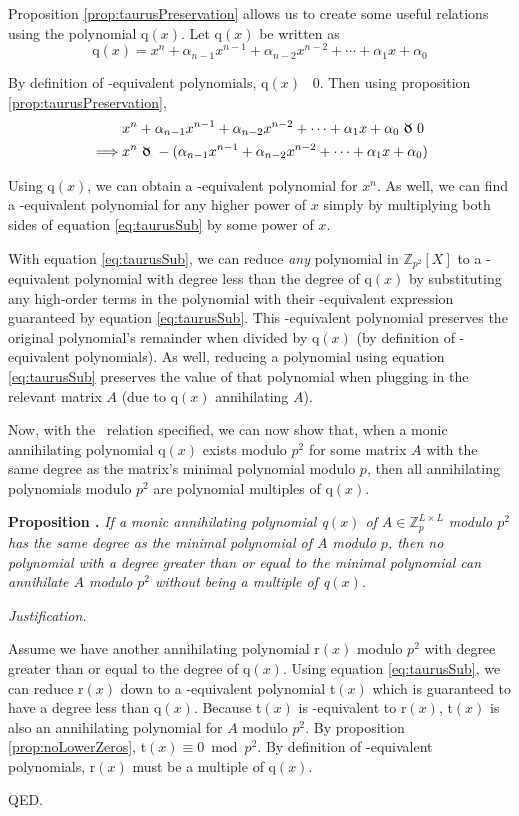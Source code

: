 \documentclass[a4paper, 12pt, reqno]{amsart}
\newcounter{propcounter}
\newenvironment{proposition}[1]
{
	\vspace{1em}
	\refstepcounter{propcounter} %
	\textbf{Proposition \thepropcounter.} \emph{#1}
	
	\emph{Justification.}
}
{
	QED. \\
}
\begin{document}
		Proposition \ref{prop:taurusPreservation} allows us to create some useful relations using the polynomial q$(x)$. Let q$(x)$ be written as
		\[
			\text{q}(x) = x^n + \alpha_{n-1}x^{n-1} + \alpha_{n-2}x^{n-2} + \cdots + \alpha_1x + \alpha_0
		\]
		
		By definition of \Taurus-equivalent polynomials, q$(x)$ \Taurus\ 0. Then using proposition \ref{prop:taurusPreservation},
		\begin{align}
			         & x^n + \alpha_{n-1}x^{n-1} + \alpha_{n-2}x^{n-2} + \cdots + \alpha_1x + \alpha_0 \ \text{\Taurus}\ 0 \nonumber \\
			\implies & x^n \ \text{\Taurus}\ -(\alpha_{n-1}x^{n-1} + \alpha_{n-2}x^{n-2} + \cdots + \alpha_1x + \alpha_0)
			\label{eq:taurusSub}
		\end{align}
		
		Using q$(x)$, we can obtain a \Taurus-equivalent polynomial for $x^n$. As well, we can find a \Taurus-equivalent polynomial for any higher power of $x$ simply by 
		multiplying both sides of equation \ref{eq:taurusSub} by some power of $x$.
		
		With equation \ref{eq:taurusSub}, we can reduce \emph{any} polynomial in $\mathds{Z}_{p^2}[X]$ to a \Taurus-equivalent polynomial with degree less than the 
		degree of q$(x)$ by substituting any high-order terms in the polynomial with their \Taurus-equivalent expression guaranteed by equation \ref{eq:taurusSub}. This 
		\Taurus-equivalent polynomial preserves the original polynomial's remainder when divided by q$(x)$ (by definition of \Taurus-equivalent polynomials). As well, 
		reducing a polynomial using equation \ref{eq:taurusSub} preserves the value of that polynomial when plugging in the relevant matrix $A$ (due to q$(x)$ annihilating 
		$A$).
		
		Now, with the \Taurus\ relation specified, we can now show that, when a monic annihilating polynomial q$(x)$ exists modulo $p^2$ for some matrix $A$ with the same 
		degree as the matrix's minimal polynomial modulo $p$, then all annihilating polynomials modulo $p^2$ are polynomial multiples of q$(x)$.

		\begin{proposition}{If a monic annihilating polynomial q$(x)$ of $A \in \mathds{Z}_{p}^{L \times L}$ modulo $p^2$ has the same degree as the minimal polynomial of $A$
		modulo $p$, then no polynomial with a degree greater than or equal to the minimal polynomial can annihilate $A$ modulo $p^2$ without being a multiple of q$(x)$.}
			\label{prop:noHigherZeros}
			Assume we have another annihilating polynomial r$(x)$ modulo $p^2$ with degree greater than or equal to the degree of q$(x)$. Using equation \ref{eq:taurusSub}, 
			we can reduce r$(x)$ down to a \Taurus-equivalent polynomial t$(x)$ which is guaranteed to have a degree less than q$(x)$. Because t$(x)$ is
			\Taurus-equivalent to r$(x)$, t$(x)$ is also an annihilating polynomial for $A$ modulo $p^2$. By proposition \ref{prop:noLowerZeros}, 
			t$(x) \equiv 0 \bmod{p^2}$. By definition of \Taurus-equivalent polynomials, r$(x)$ must be a multiple of q$(x)$.
		\end{proposition}
		
\end{document}
